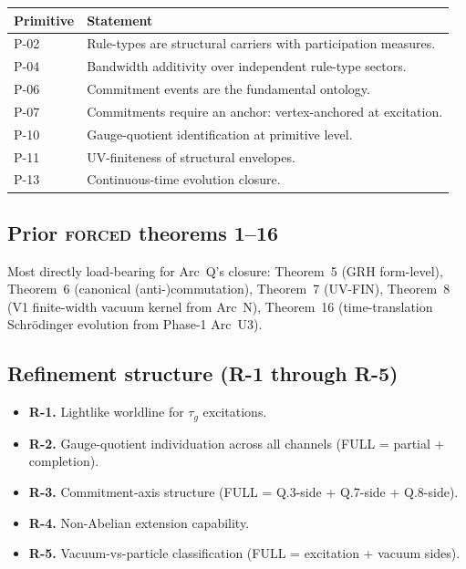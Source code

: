 \documentclass[11pt,a4paper]{article}
\begin{document}
\begin{center}
\begin{tabular}{ll}
\toprule
\textbf{Primitive} & \textbf{Statement} \\
\midrule
P-02 & Rule-types are structural carriers with participation measures. \\
P-04 & Bandwidth additivity over independent rule-type sectors. \\
P-06 & Commitment events are the fundamental ontology. \\
P-07 & Commitments require an anchor: vertex-anchored at excitation. \\
P-10 & Gauge-quotient identification at primitive level. \\
P-11 & UV-finiteness of structural envelopes. \\
P-13 & Continuous-time evolution closure. \\
\bottomrule
\end{tabular}
\end{center}

\subsection{Prior \textsc{forced} theorems 1--16}

Most directly load-bearing for Arc~Q's closure: Theorem~5 (GRH form-level), Theorem~6 (canonical (anti-)commutation), Theorem~7 (UV-FIN), Theorem~8 (V1 finite-width vacuum kernel from Arc~N), Theorem~16 (time-translation Schr\"odinger evolution from Phase-1 Arc~U3).

\subsection{Refinement structure (R-1 through R-5)}

\begin{itemize}[leftmargin=1.5em]
  \item \textbf{R-1.} Lightlike worldline for $\tau_g$ excitations.
  \item \textbf{R-2.} Gauge-quotient individuation across all channels (FULL = partial + completion).
  \item \textbf{R-3.} Commitment-axis structure (FULL = Q.3-side + Q.7-side + Q.8-side).
  \item \textbf{R-4.} Non-Abelian extension capability.
  \item \textbf{R-5.} Vacuum-vs-particle classification (FULL = excitation + vacuum sides).
\end{itemize}
\end{document}
